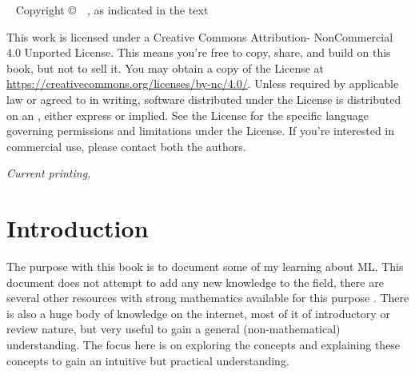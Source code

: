 
\frontmatter

\blankpage


\maketitle


\newpage
\begin{fullwidth}
~\vfill
\thispagestyle{empty}
\setlength{\parindent}{0pt}
\setlength{\parskip}{\baselineskip}
Copyright \copyright\ \the\year\ \thanklessauthor, as indicated in the text


\par{}

\par
This work is licensed under a Creative Commons Attribution-
NonCommercial 4.0 Unported License. This means you’re free to
copy, share, and build on this book, but not to sell it. 
You may obtain a copy
of the License at \url{https://creativecommons.org/licenses/by-nc/4.0/}. Unless
required by applicable law or agreed to in writing, software distributed
under the License is distributed on an , either express or implied. See the
License for the specific language governing permissions and limitations
under the License.
If you’re interested in commercial use, please contact both the authors.

\par\textit{Current printing, \monthyear}
\end{fullwidth}

\tableofcontents

\listoffigures





\mainmatter

\chapter*{Introduction}

The purpose with this book is to document some of my learning about \ac{ML}.
This document does not attempt to add any new knowledge to the field, there are several other resources with strong mathematics available for this purpose \cite{geron2017handson,Webb2002statpatn,Michie94,theodoridis2003,Duda2001,Bishop1995,Bishop2006,Goodfellow2016}. There is also a huge body of knowledge on the internet, most of it of introductory or review nature, but very useful to gain a general (non-mathematical) understanding.
The focus here is on exploring the concepts and explaining these concepts to gain an intuitive but practical understanding.

